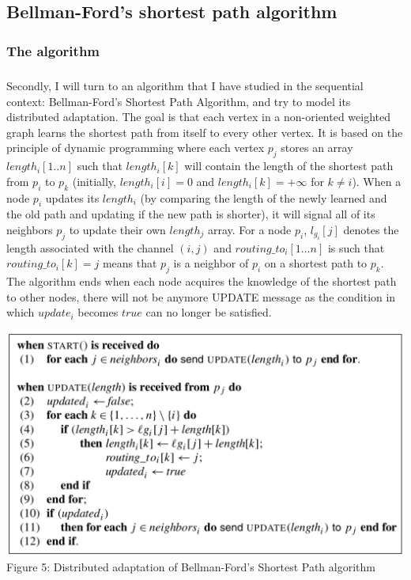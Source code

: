 \documentclass{article}
\begin{document}
	\subsection{Bellman-Ford's shortest path algorithm}
	\subsubsection{The algorithm \cite{b2}}
	\subparagraph{}Secondly, I will turn to an algorithm that I have studied in the sequential context: Bellman-Ford's Shortest Path Algorithm, and try to model its distributed adaptation. The goal is that each vertex in a non-oriented weighted graph learns the shortest path from itself to every other vertex. It is based on the principle of dynamic programming where each vertex $p_{j}$ stores an array $length_{i}[1..n]$ such that $length_{i}[k]$ will contain the length of the shortest path from $p_{i}$ to $p_{k}$ (initially, $length_{i}[i]=0$ and $length_{i}[k]=+\infty$ for $k \neq i$). When a node $p_{i}$ updates its $length_{i}$ (by comparing the length of the newly learned and the old path and updating if the new path is shorter), it will signal all of its neighbors $p_{j}$ to update their own $length_{j}$ array. For a node $p_{i}$, $l_{g_{i}}[j]$ denotes the length associated with the channel $(i,j)$ and $routing\_to_{i}[1...n]$ is such that $routing\_to_{i}[k]=j$ means that $p_{j}$ is a neighbor of $p_{i}$ on a shortest path to $p_{k}$. The algorithm ends when each node acquires the knowledge of the shortest path to other nodes, there will not be anymore UPDATE message as the condition in which $update_{i}$ becomes $true$ can no longer be satisfied.
	\begin{center}
		\includegraphics[scale=0.25]{IMG_7653}
		\\Figure 5: Distributed adaptation of Bellman-Ford's Shortest Path algorithm
	\end{center}
\end{document}
